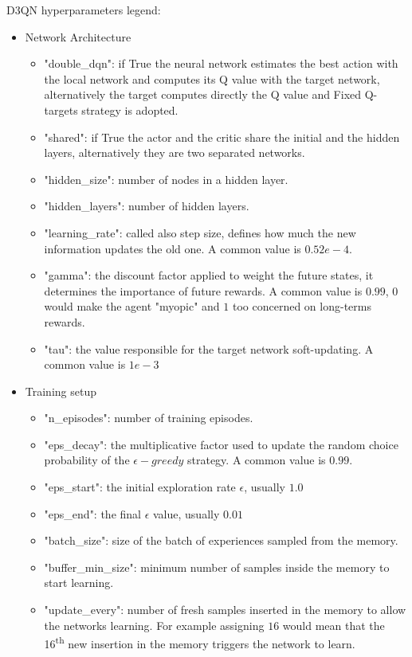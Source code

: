 \documentclass[11pt, a4paper, hidelinks]{report}
\begin{document}
D3QN hyperparameters legend:
\begin{itemize}
	\item Network Architecture
	\begin{itemize}
		\item "double\_dqn": if True the neural network estimates the best action with the local network and computes its Q value with the target network, alternatively the target computes directly the Q value and Fixed Q-targets strategy is adopted.
		\item "shared": if True the actor and the critic share the initial and the hidden layers, alternatively they are two separated networks.
		\item "hidden\_size": number of nodes in a hidden layer.
		\item "hidden\_layers": number of hidden layers.
		\item "learning\_rate": called also step size, defines how much the new information updates the old one.
A common value is $0.52e-4$.
		\item "gamma": the discount factor applied to weight the future states, it determines the importance of future rewards.
A common value is $0.99$, $0$ would make the agent "myopic" and $1$ too concerned on long-terms rewards.
		\item "tau": the value responsible for the target network soft-updating.
A common value is $1e-3$
	\end{itemize}
	\item Training setup
	\begin{itemize}
		\item "n\_episodes": number of training episodes.
        \item "eps\_decay": the multiplicative factor used to update the random choice probability of the $\epsilon-greedy$ strategy.
A common value is $0.99$.
        \item "eps\_start": the initial exploration rate $\epsilon$, usually $1.0$
        \item "eps\_end": the final $\epsilon$ value, usually $0.01$
		\item "batch\_size": size of the batch of experiences sampled from the memory.
		\item "buffer\_min\_size": minimum number of samples inside the memory to start learning.
		\item "update\_every": number of fresh samples inserted in the memory to allow the networks learning.
For example assigning $16$ would mean that the 16\textsuperscript{th} new insertion in the memory triggers the network to learn.

\end{itemize}
\end{itemize}
\end{document}
